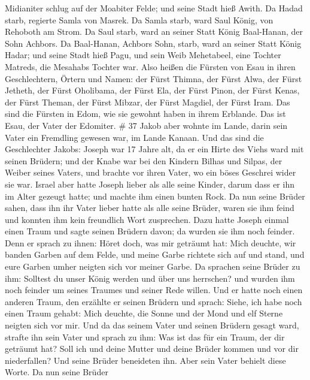 Midianiter schlug auf der Moabiter Felde; und seine Stadt hieß Awith.
 Da Hadad starb, regierte Samla von Masrek. 
Da Samla starb, ward Saul König, von Rehoboth am Strom.  Da
Saul starb, ward an seiner Statt König Baal-Hanan, der Sohn Achbors.
 Da Baal-Hanan, Achbors Sohn, starb, ward an seiner Statt
König Hadar; und seine Stadt hieß Pagu, und sein Weib Mehetabeel, eine
Tochter Matreds, die Mesahabs Tochter war.  Also heißen die
Fürsten von Esau in ihren Geschlechtern, Örtern und Namen: der Fürst
Thimna, der Fürst Alwa, der Fürst Jetheth,  der Fürst
Oholibama, der Fürst Ela, der Fürst Pinon,  der Fürst
Kenas, der Fürst Theman, der Fürst Mibzar,  der Fürst
Magdiel, der Fürst Iram. Das sind die Fürsten in Edom, wie sie gewohnt
haben in ihrem Erblande. Das ist Esau, der Vater der Edomiter. \# 37
 Jakob aber wohnte im Lande, darin sein Vater ein Fremdling
gewesen war, im Lande Kanaan.  Und das sind die Geschlechter
Jakobs: Joseph war 17 Jahre alt, da er ein Hirte des Viehs ward mit
seinen Brüdern; und der Knabe war bei den Kindern Bilhas und Silpas, der
Weiber seines Vaters, und brachte vor ihren Vater, wo ein böses Geschrei
wider sie war.  Israel aber hatte Joseph lieber als alle
seine Kinder, darum dass er ihn im Alter gezeugt hatte; und machte ihm
einen bunten Rock.  Da nun seine Brüder sahen, dass ihn ihr
Vater lieber hatte als alle seine Brüder, waren sie ihm feind und
konnten ihm kein freundlich Wort zusprechen.  Dazu hatte
Joseph einmal einen Traum und sagte seinen Brüdern davon; da wurden sie
ihm noch feinder.  Denn er sprach zu ihnen: Höret doch, was
mir geträumt hat:  Mich deuchte, wir banden Garben auf dem
Felde, und meine Garbe richtete sich auf und stand, und eure Garben
umher neigten sich vor meiner Garbe.  Da sprachen seine
Brüder zu ihm: Solltest du unser König werden und über uns herrschen?
und wurden ihm noch feinder um seines Traumes und seiner Rede willen.
 Und er hatte noch einen anderen Traum, den erzählte er
seinen Brüdern und sprach: Siehe, ich habe noch einen Traum gehabt: Mich
deuchte, die Sonne und der Mond und elf Sterne neigten sich vor mir.
 Und da das seinem Vater und seinen Brüdern gesagt ward,
strafte ihn sein Vater und sprach zu ihm: Was ist das für ein Traum, der
dir geträumt hat? Soll ich und deine Mutter und deine Brüder kommen und
vor dir niederfallen?  Und seine Brüder beneideten ihn.
Aber sein Vater behielt diese Worte.  Da nun seine Brüder
